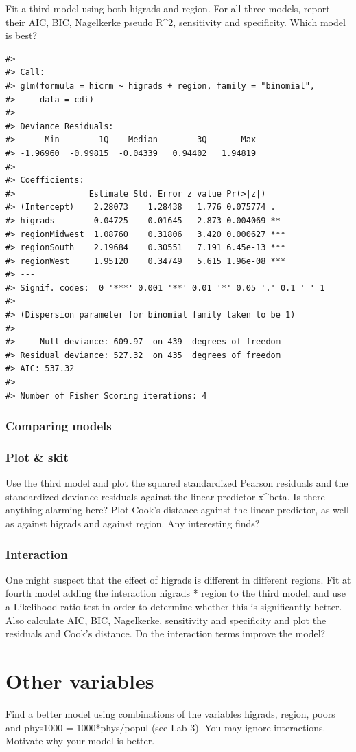 \documentclass[a4paper]{article}
\begin{document}
Fit a third model using both higrads and region. For all three models,
report their AIC, BIC, Nagelkerke pseudo R\^{}2, sensitivity and
specificity. Which model is best?

\begin{verbatim}
#> 
#> Call:
#> glm(formula = hicrm ~ higrads + region, family = "binomial", 
#>     data = cdi)
#> 
#> Deviance Residuals: 
#>      Min        1Q    Median        3Q       Max  
#> -1.96960  -0.99815  -0.04339   0.94402   1.94819  
#> 
#> Coefficients:
#>               Estimate Std. Error z value Pr(>|z|)    
#> (Intercept)    2.28073    1.28438   1.776 0.075774 .  
#> higrads       -0.04725    0.01645  -2.873 0.004069 ** 
#> regionMidwest  1.08760    0.31806   3.420 0.000627 ***
#> regionSouth    2.19684    0.30551   7.191 6.45e-13 ***
#> regionWest     1.95120    0.34749   5.615 1.96e-08 ***
#> ---
#> Signif. codes:  0 '***' 0.001 '**' 0.01 '*' 0.05 '.' 0.1 ' ' 1
#> 
#> (Dispersion parameter for binomial family taken to be 1)
#> 
#>     Null deviance: 609.97  on 439  degrees of freedom
#> Residual deviance: 527.32  on 435  degrees of freedom
#> AIC: 537.32
#> 
#> Number of Fisher Scoring iterations: 4
\end{verbatim}

\hypertarget{comparing-models}{%
\subsubsection{Comparing models}\label{comparing-models}}

\hypertarget{plot-skit}{%
\subsubsection{Plot \& skit}\label{plot-skit}}

Use the third model and plot the squared standardized Pearson residuals
and the standardized deviance residuals against the linear predictor
x\^{}beta. Is there anything alarming here? Plot Cook's distance against
the linear predictor, as well as against higrads and against region. Any
interesting finds?

\hypertarget{interaction}{%
\subsubsection{Interaction}\label{interaction}}

One might suspect that the effect of higrads is different in different
regions. Fit at fourth model adding the interaction higrads * region to
the third model, and use a Likelihood ratio test in order to determine
whether this is significantly better. Also calculate AIC, BIC,
Nagelkerke, sensitivity and specificity and plot the residuals and
Cook's distance. Do the interaction terms improve the model?

\hypertarget{other-variables}{%
\section{Other variables}\label{other-variables}}

Find a better model using combinations of the variables higrads, region,
poors and phys1000 = 1000*phys/popul (see Lab 3). You may ignore
interactions. Motivate why your model is better.
\end{document}
